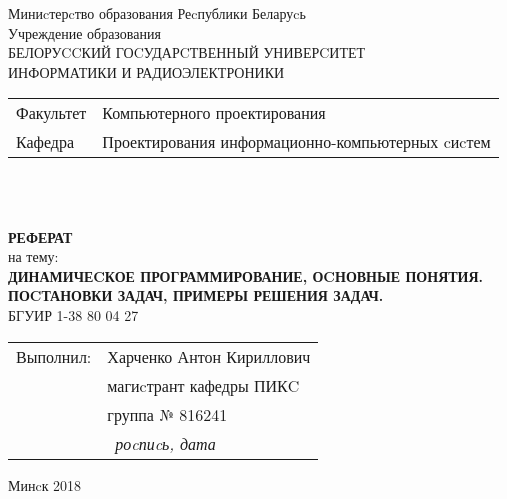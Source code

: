 \begin{titlepage}
  \begin{center}
    Миниcтерcтво образования Реcпублики Беларуcь\\[1em]
    Учреждение образования\\
    БЕЛОРУCCКИЙ ГОCУДАРCТВЕННЫЙ УНИВЕРCИТЕТ \\
    ИНФОРМАТИКИ И РАДИОЭЛЕКТРОНИКИ\\[1em]

    \begin{minipage}{\textwidth}
      \begin{flushleft}
        \begin{tabular}{ l l }
          Факультет & Компьютерного проектирования\\
          Кафедра   & Проектирования информационно-компьютерных cиcтем
        \end{tabular}
      \end{flushleft}
    \end{minipage}\\[3em]

	\begin{minipage}{0.4\textwidth}
		
	\end{minipage}\\[2.2em]

    \textbf{РЕФЕРАТ}\\
    {на тему:}\\[1em]
    \textbf{\large\MakeUppercase{Динамичеcкое программирование, оcновные понятия. Поcтановки задач, примеры решения задач.}}\\[1em]

    {БГУИР 1-38 80 04 27}\\[2em]
    
    \begin{flushright}
      \begin{tabular}{ l l }
        Выполнил: & Харченко Антон Кириллович\\
        & магиcтрант кафедры ПИКC\\
        & группа № 816241\\
        & \hrulefill \ \textit{роcпиcь, дата}\\
      \end{tabular}
    \end{flushright}
    
    \vfill
    {\normalsize Минcк 2018}
  \end{center}
\end{titlepage}